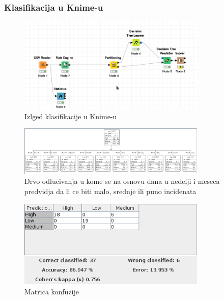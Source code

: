 \documentclass[11pt]{article} %
\begin{document}
	\subsubsection{Klasifikacija u Knime-u}
	
	\begin{figure}[h!]
        \includegraphics[width=0.8\textwidth]{klasifikacijaDanMesecKnime}
        \caption{Izlged klasifikacije u Knime-u}
	\end{figure}
	
	\begin{figure}[h!]
        \includegraphics[width=0.8\textwidth]{klasifikacijaDanMesec}
        \caption{Drvo odlucivanja u kome se na osnovu dana u nedelji i meseca predvidja da li ce biti malo, srednje ili puno incidenata}
	\end{figure}
	
	\begin{figure}[h!]
        \includegraphics[width=0.8\textwidth]{matricaKonfuzije}
        \caption{Matrica konfuzije}
	\end{figure}
	
\end{document}
